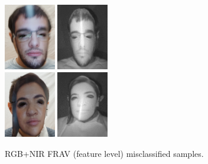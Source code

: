 \begin{figure}[htb]
\centering
\includegraphics[width=0.2\textwidth]{images_databases/frav_rgb_151.JPG}
\includegraphics[width=0.2\textwidth]{images_databases/frav_nir_151.JPG} 
\\
\includegraphics[width=0.2\textwidth]{images_databases/frav_rgb_128.JPG}
\includegraphics[width=0.2\textwidth]{images_databases/frav_nir_128.JPG}
\caption{RGB+NIR FRAV (feature level) misclassified samples.} \label{fig:frav_feat_miscl}
\end{figure}

